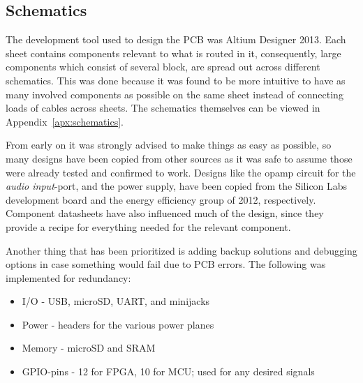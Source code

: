 
\subsection{Schematics}

The development tool used to design the PCB was Altium Designer 2013. Each sheet
contains components relevant to what is routed in it, consequently, large
components which consist of several block, are spread out across different
schematics. This was done because it was found to be more  intuitive to have as
many involved components as possible on the same sheet instead of connecting
loads of cables across sheets. The schematics themselves can be viewed in
Appendix~\ref{apx:schematics}.

From early on it was strongly advised to make things as easy as possible, so
many designs have been copied from other sources as it was safe to assume those
were already tested and confirmed to work. Designs like the opamp circuit for
the \emph{audio input}-port, and the power supply, have been copied from the
Silicon Labs development board and the energy efficiency group of 2012,
respectively. Component datasheets have also influenced much of the design,
since they provide a recipe for everything needed for the relevant component.

Another thing that has been prioritized is adding backup solutions and debugging
options in case something would fail due to PCB errors. The following was implemented for redundancy:

\begin{itemize}
 \item I/O - USB, microSD, UART, and minijacks
 \item Power - headers for the various power planes
 \item Memory - microSD and SRAM
 \item GPIO-pins - 12 for FPGA, 10 for MCU; used for any desired signals
\end{itemize}
